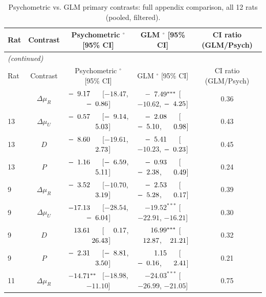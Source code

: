 \begin{longtable}{lcccc}
\caption{Psychometric vs. GLM primary contrasts: full appendix comparison, all 12 rats (pooled, filtered).}
\label{tab:comparison-full} \\
\toprule
Rat & Contrast & Psychometric $^{\circ}$ [95\% CI] & GLM $^{\circ}$ [95\% CI] & CI ratio (GLM/Psych) \\
\midrule
\endfirsthead
\multicolumn{5}{l}{\textit{(continued)}} \\
\toprule
Rat & Contrast & Psychometric $^{\circ}$ [95\% CI] & GLM $^{\circ}$ [95\% CI] & CI ratio (GLM/Psych) \\
\midrule
\endhead
\bottomrule
\endfoot
\bottomrule
\endlastfoot
13 & $\Delta\mu_{R}$ & $-\hphantom{0}9.17^{\hphantom{***}}$ [$-18.47$, $-\hphantom{0}0.86$] & $-\hphantom{0}7.49^{***}$ [$-10.62$, $-\hphantom{0}4.25$] & 0.36 \\
13 & $\Delta\mu_{U}$ & $-\hphantom{0}0.57^{\hphantom{***}}$ [$-\hphantom{0}9.14$, $\hphantom{-}\hphantom{0}5.03$] & $-\hphantom{0}2.08^{\hphantom{***}}$ [$-\hphantom{0}5.10$, $\hphantom{-}\hphantom{0}0.98$] & 0.43 \\
13 & $D$ & $-\hphantom{0}8.60^{\hphantom{***}}$ [$-19.61$, $\hphantom{-}\hphantom{0}2.73$] & $-\hphantom{0}5.41^{\hphantom{***}}$ [$-10.23$, $-\hphantom{0}0.23$] & 0.45 \\
13 & $P$ & $-\hphantom{0}1.16^{\hphantom{***}}$ [$-\hphantom{0}6.59$, $\hphantom{-}\hphantom{0}5.11$] & $-\hphantom{0}0.93^{\hphantom{***}}$ [$-\hphantom{0}2.38$, $\hphantom{-}\hphantom{0}0.49$] & 0.24 \\
9 & $\Delta\mu_{R}$ & $-\hphantom{0}3.52^{\hphantom{***}}$ [$-10.70$, $\hphantom{-}\hphantom{0}3.19$] & $-\hphantom{0}2.53^{\hphantom{***}}$ [$-\hphantom{0}5.28$, $\hphantom{-}\hphantom{0}0.17$] & 0.39 \\
9 & $\Delta\mu_{U}$ & $-17.13^{\hphantom{***}}$ [$-28.54$, $-\hphantom{0}6.04$] & $-19.52^{***}$ [$-22.91$, $-16.21$] & 0.30 \\
9 & $D$ & $\hphantom{-}13.61^{\hphantom{***}}$ [$\hphantom{-}\hphantom{0}0.17$, $\hphantom{-}26.43$] & $\hphantom{-}16.99^{***}$ [$\hphantom{-}12.87$, $\hphantom{-}21.21$] & 0.32 \\
9 & $P$ & $-\hphantom{0}2.31^{\hphantom{***}}$ [$-\hphantom{0}8.81$, $\hphantom{-}\hphantom{0}3.50$] & $\hphantom{-}\hphantom{0}1.15^{\hphantom{***}}$ [$-\hphantom{0}0.16$, $\hphantom{-}\hphantom{0}2.41$] & 0.21 \\
11 & $\Delta\mu_{R}$ & $-14.71^{**\hphantom{*}}$ [$-18.98$, $-11.10$] & $-24.03^{***}$ [$-26.99$, $-21.05$] & 0.75 \\

\end{longtable}
